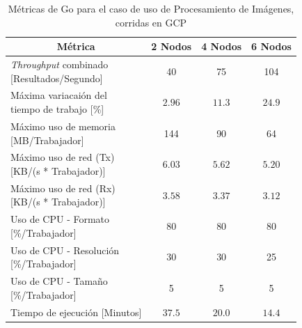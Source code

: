 \documentclass[11pt]{article}
\providecommand{\row}[1]{\parbox{150pt}{\setlength{\baselineskip}{0.2\baselineskip}\strut#1\strut}}
\newcommand{\ipcap}[2]{\caption{Métricas de #1 para el caso de uso de Procesamiento de Imágenes, corridas en #2}}
\newcommand{\english}[1]{\textit{#1}}
\begin{document}
\begin{table}[H]
\centering
\begin{tabular}{|l|c|c|c|}
\hline
\multicolumn{1}{|c|}{Métrica} & 2 Nodos & 4 Nodos & 6 Nodos \\ \hline
\row{\english{Throughput} combinado\\{[Resultados/Segundo]}} & 40 & 75 & 104 \\ \hline
\row{Máxima variacaión del \\ tiempo de trabajo {[}\%{]}} & $2.96$ & $11.3$ & $24.9$ \\ \hline
\row{Máximo uso de memoria \\ {[MB/Trabajador]}} & 144 & 90 & 64 \\ \hline
\row{Máximo uso de red (Tx) \\ {[KB/(s * Trabajador)]}} & $6.03$ & $5.62$ & $5.20$ \\ \hline
\row{Máximo uso de red (Rx) \\ {[KB/(s * Trabajador)]}} & $3.58$ & $3.37$ & $3.12$ \\ \hline
\row{Uso de CPU - Formato\\{[\%/Trabajador]}} & 80 & 80 & 80 \\ \hline
\row{Uso de CPU - Resolución\\{[\%/Trabajador]}} & 30 & 30 & 25 \\ \hline
\row{Uso de CPU - Tamaño\\{[\%/Trabajador]}} & 5 & 5 & 5 \\ \hline
Tiempo de ejecución [Minutos] & $37.5$ & $20.0$ & $14.4$ \\ \hline
\end{tabular}
\ipcap{Go}{GCP}
\end{table}
\end{document}
